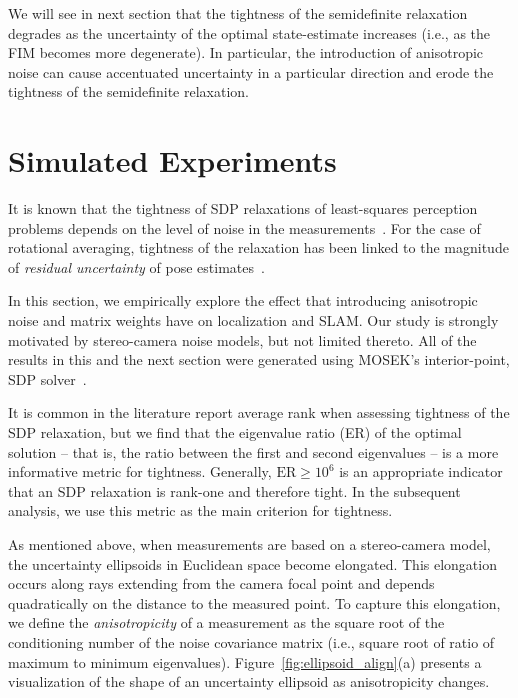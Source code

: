 \documentclass[lettersize,journal]{IEEEtran}
\begin{document}
We will see in next section that the tightness of the semidefinite relaxation degrades as the uncertainty of the optimal state-estimate increases (i.e., as the FIM becomes more degenerate). In particular, the introduction of anisotropic noise can cause accentuated uncertainty in a particular direction and erode the tightness of the semidefinite relaxation. 


\section{Simulated Experiments}\label{sec:Simulations}

It is known that the tightness of SDP relaxations of least-squares perception problems depends on the level of noise in the measurements~\cite{brialesConvexGlobal3D2017, rosenSESyncCertifiablyCorrect2019, cifuentesLocalStabilitySemidefinite2022}. For the case of rotational averaging, tightness of the relaxation has been linked to the magnitude of \textit{residual uncertainty} of pose estimates~\cite{erikssonRotationAveragingStrong2018}.

In this section, we empirically explore the effect that introducing anisotropic noise and matrix weights have on localization and SLAM. Our study is strongly motivated by stereo-camera noise models, but not limited thereto. 
All of the results in this and the next section were generated using MOSEK's interior-point, SDP solver~\cite{mosek}.

It is common in the literature report average rank when assessing tightness of the SDP relaxation, but we find that the eigenvalue  ratio (ER) of the optimal solution  -- that is, the ratio between the first and second eigenvalues -- is a more informative metric for tightness. Generally, $\mbox{ER}\geq 10^6$ is an appropriate indicator that an SDP relaxation is rank-one and therefore tight. In the subsequent analysis, we use this metric as the main criterion for tightness. 

As mentioned above, when measurements are based on a stereo-camera model, the uncertainty ellipsoids in Euclidean space become elongated. This elongation occurs along rays extending from the camera focal point and depends quadratically on the distance to the measured point. To capture this elongation, we define the \textit{anisotropicity} of a measurement as the square root of the conditioning number of the noise covariance matrix (i.e., square root of ratio of maximum to minimum eigenvalues). Figure~\ref{fig:ellipsoid_align}(a) presents a visualization of the shape of an uncertainty ellipsoid as anisotropicity changes.
\end{document}
